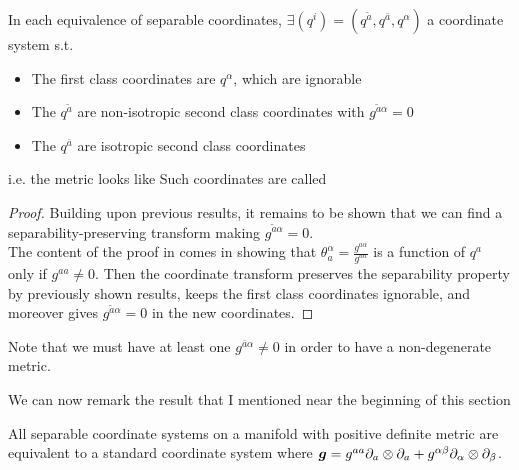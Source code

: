 \documentclass{article}
\begin{document}
\begin{prop}
In each equivalence of separable coordinates, $\exists (q^i) = (q^{\tilde{a}}, q^{\bar{a}}, q^\alpha)$ a coordinate system s.t. 
\begin{itemize}
    \item The first class coordinates are $q^\alpha$, which are ignorable
    \item The $q^{\tilde{a}}$ are non-isotropic second class coordinates with $g^{\tilde{a}\alpha}=0$
    \item The $q^{\bar{a}}$ are isotropic second class coordinates
\end{itemize}
i.e. the metric looks like 
Such coordinates are called 
\end{prop}
\begin{proof}
Building upon previous results, it remains to be shown that we can find a separability-preserving transform making $g^{\tilde{a}\alpha} = 0$. \\
The content of the proof in \cite{Benenti1991} comes in showing that $\theta_a^\alpha = \frac{g^{a\alpha}}{g^{aa}}$ is a function of $q^a$ only if $g^{aa} \neq 0$. Then the coordinate transform 
preserves the separability property by previously shown results, keeps the first class coordinates ignorable, and moreover gives $g^{\tilde{a}\alpha}=0$ in the new coordinates. 
\end{proof}
\begin{remark}
Note that we must have at least one $g^{\bar{a}\alpha}\neq 0$ in order to have a non-degenerate metric. 
\end{remark}

We can now remark the result that I mentioned near the beginning of this section 

\begin{theorem}
All separable coordinate systems on a manifold with positive definite metric are equivalent to a standard coordinate system where $\bm{g} = g^{aa} \partial_a \otimes \partial_a + g^{\alpha\beta} \partial_\alpha \otimes \partial_\beta$. 
\end{theorem}
\end{document}
